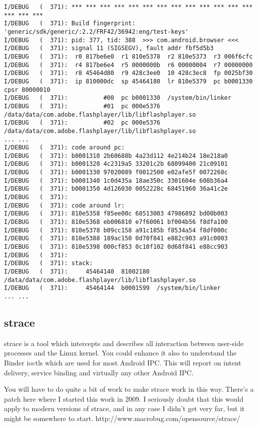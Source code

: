 \documentclass[a4paper,titlepage]{article}
\begin{document}
\begin{lstlisting}[caption=debugerd的输出, basicstyle=\tiny]
I/DEBUG   (  371): *** *** *** *** *** *** *** *** *** *** *** *** *** *** *** *** 
I/DEBUG   (  371): Build fingerprint: 'generic/sdk/generic/:2.2/FRF42/36942:eng/test-keys' 
I/DEBUG   (  371): pid: 377, tid: 388  >>> com.android.browser <<< 
I/DEBUG   (  371): signal 11 (SIGSEGV), fault addr fbf5d5b3 
I/DEBUG   (  371):  r0 817be6e0  r1 810e5378  r2 810e5373  r3 006f6cfc 
I/DEBUG   (  371):  r4 817be6e4  r5 0000000b  r6 00000004  r7 00000000 
I/DEBUG   (  371):  r8 45464d80  r9 428c3ee0  10 428c3ec8  fp 0025bf30 
I/DEBUG   (  371):  ip 810000dc  sp 45464180  lr 810e5379  pc b0001330  cpsr 80000010 
I/DEBUG   (  371):          #00  pc b0001330  /system/bin/linker 
I/DEBUG   (  371):          #01  pc 000e5376  /data/data/com.adobe.flashplayer/lib/libflashplayer.so 
I/DEBUG   (  371):          #02  pc 000e5376  /data/data/com.adobe.flashplayer/lib/libflashplayer.so 
... ... 
I/DEBUG   (  371): code around pc: 
I/DEBUG   (  371): b0001310 2b60688b 4a23d112 4e214b24 18e218a0 
I/DEBUG   (  371): b0001320 4c2319a5 33201c2b 68099400 21c09101 
I/DEBUG   (  371): b0001330 97020089 f0012500 e02afe5f 0072268c 
I/DEBUG   (  371): b0001340 1c0d435a 18ae350c 3301604e 608b36a4 
I/DEBUG   (  371): b0001350 4d126030 0052228c 68451960 36a41c2e 
I/DEBUG   (  371): 
I/DEBUG   (  371): code around lr: 
I/DEBUG   (  371): 810e5358 f85ee00c 68513003 47986892 bd00b003 
I/DEBUG   (  371): 810e5368 eb006810 e7f60061 bf004b56 f8dfa100 
I/DEBUG   (  371): 810e5378 b09cc158 a91c185b f8534a54 f8df000c 
I/DEBUG   (  371): 810e5388 189ac150 0d70f841 e882c903 a91c0003 
I/DEBUG   (  371): 810e5398 000cf853 0c10f102 0d68f841 e88cc903 
I/DEBUG   (  371): 
I/DEBUG   (  371): stack: 
I/DEBUG   (  371):     45464140  81002180  /data/data/com.adobe.flashplayer/lib/libflashplayer.so 
I/DEBUG   (  371):     45464144  b0001599  /system/bin/linker 
... ... 
\end{lstlisting}

\subsection{strace}
strace is a tool which intercepts and describes all interaction between user-side processes and the Linux kernel. You could enhance it also to understand the Binder ioctls which are used for most Android IPC. This will report on intent delivery, service binding and virtually any other Android IPC.

You will have to do quite a bit of work to make strace work in this way. There's a patch here where I started this work in 2009. I seriously doubt that this would apply to modern versions of strace, and in any case I didn't get very far, but it might be somewhere to start.
http://www.macrobug.com/opensource/strace/
\end{document}
